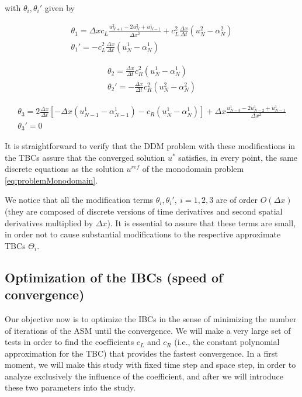 \noindent with $\theta_i, \theta_i'$ given by

\begin{gather*}
    \theta_1 = \Delta x c_L \frac{u_{N+1}^2 - 2u_{N}^2 + u_{N-1}^1}{\Delta x^2} + c_L^2\frac{\Delta x}{\Delta t} \left( u_{N}^2 - \alpha_{N}^2 \right)\\
    \theta_1' = - c_L^2\frac{\Delta x}{\Delta t} \left( u_{N}^1 - \alpha_{N}^1 \right)
\end{gather*}

\begin{equation*}
\begin{gathered}
    \theta_2 = \frac{\Delta x}{\Delta t} c_R^2 (u_N^1 - \alpha_N^1) \\
    \theta_2' = -\frac{\Delta x}{\Delta t} c_R^2 (u_N^2 - \alpha_N^2)
\end{gathered}
\end{equation*}

\begin{equation*}
\begin{gathered}
    \theta_3 = 2\frac{\Delta x}{\Delta t} \left[-\Delta x(u_{N-1}^1 - \alpha_{N-1}^1) - c_R (u_N^1 - \alpha_N^1) \right] + \Delta x \frac{u_{N-3}^1 - 2u_{N-2}^1 + u_{N-1}^1}{\Delta x^2} \\
    \theta_3' = 0
\end{gathered}
\end{equation*}

\indent It is straightforward to verify that the DDM problem with these modifications in the TBCs assure that the converged solution $u^*$ satisfies, in every point, the same discrete equations as the solution $u^{ref}$ of the monodomain problem \eqref{eq:problemMonodomain}.

\indent We notice that all the modification terms $\theta_i,\theta_i', \ i = 1,2,3$ are of order $O(\Delta x)$ (they are composed of discrete versions of time derivatives and second spatial derivatives multiplied by $\Delta x$). It is essential to assure that these terms are small, in order not to cause substantial modifications to the respective approximate TBCs $\Theta_i$.


\subsection{Optimization of the IBCs (speed of convergence)}

\indent Our objective now is to optimize the IBCs in the sense of minimizing the number of iterations of the ASM until the convergence. We will make a very large set of tests in order to find the coefficients $c_L$ and $c_R$ (i.e., the constant polynomial approximation for the TBC) that provides the fastest convergence. In a first moment, we will make this study with fixed time step and space step, in order to analyze exclusively the influence of the coefficient, and after we will introduce these two parameters into the study.


